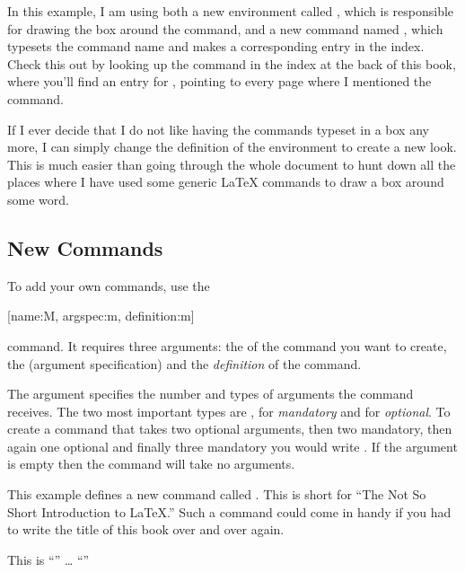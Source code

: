 \begin{example}
\begin{lscommand}
\end{lscommand}
\end{example}

In this example, I am using both a new environment called
, which is responsible for drawing the box around the
command, and a new command named , which typesets the command
name and makes a corresponding entry in the index. Check
this out by looking up the  command in the index at the back
of this book, where you'll find an entry for , pointing to
every page where I mentioned the  command.

If I ever decide that I do not like having the commands typeset in
a box any more, I can simply change the definition of the
 environment to create a new look. This is much
easier than going through the whole document to hunt down all the
places where I have used some generic \LaTeX{} commands to draw a
box around some word.

\subsection{New Commands}\label{sec:new_commands}

To add your own commands, use the
\begin{lscommand}
  [name:M, argspec:m, definition:m]
\end{lscommand}
\noindent command. It requires three arguments: the  of the command
you want to create, the  (argument specification) and the
\emph{definition} of the command.

The  argument specifies the number and types of arguments the
command receives. The two most important types are , for \emph{mandatory} and  for \emph{optional}. To create a
command that takes two optional arguments, then two mandatory, then again one
optional and finally three mandatory you would write . If the
 argument is empty then the command will take no arguments.

This example defines a new command called . This is
short for ``The Not So Short Introduction to \LaTeX.'' Such a command
could come in handy if you had to write the title of this book over
and over again.

\begin{example}
This is \enquote{\tnss} \ldots{}
\enquote{\tnss}
\end{example}

